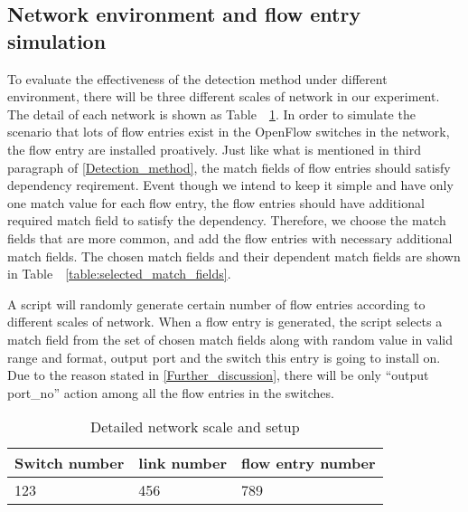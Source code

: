 \subsection{Network environment and flow entry simulation} 
To evaluate the effectiveness of the detection method under different environment, there will be three different scales of network in our experiment. The detail of each network is shown as Table~~\ref{table:network_env}. In order to simulate the scenario that lots of flow entries exist in the OpenFlow switches in the network, the flow entry are installed proatively. Just like what is mentioned in third paragraph of \ref{Detection_method}, the match fields of flow entries should satisfy dependency reqirement. Event though we intend to keep it simple and have only one match value for each flow entry, the flow entries should have additional required match field to satisfy the dependency. Therefore, we choose the match fields that are more common, and add the flow entries with necessary additional match fields. The chosen match fields and their dependent match fields are shown in Table~~\ref{table:selected_match_fields}.

A script will randomly generate certain number of flow entries according to different scales of network.
When a flow entry is generated, the script selects a match field from the set of chosen match fields along with random value in valid range and format, output port and the switch this entry is going to install on. Due to the reason stated in \ref{Further_discussion}, there will be only ``output port\_no'' action among all the flow entries in the switches.
\begin{table}[H]
\centering
\caption{Detailed network scale and setup}
\begin{tabular}{|l|p{4cm}|p{4.5cm}|}
\hline  Switch number & link number & flow entry number \\
\hline 123 & 456 & 789	\\
\hline 
\end{tabular}
\label{table:network_env}
\end{table}



